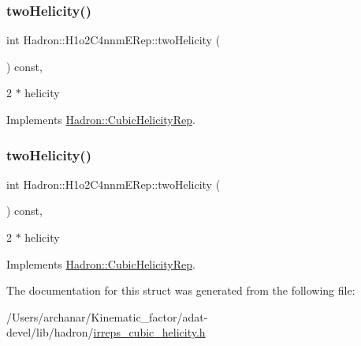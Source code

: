 \subsubsection{\texorpdfstring{twoHelicity()}{twoHelicity()}\hspace{0.1cm}{\footnotesize\ttfamily [2/3]}}
{\footnotesize\ttfamily int Hadron\+::\+H1o2\+C4nnm\+E\+Rep\+::two\+Helicity (\begin{DoxyParamCaption}{ }\end{DoxyParamCaption}) const\hspace{0.3cm}{\ttfamily [inline]}, {\ttfamily [virtual]}}

2 $\ast$ helicity 

Implements \mbox{\hyperlink{structHadron_1_1CubicHelicityRep_af507aa56fc2747eacc8cb6c96db31ecc}{Hadron\+::\+Cubic\+Helicity\+Rep}}.

\mbox{\label{structHadron_1_1H1o2C4nnmERep_ac93d65bb6c3d39b21cc3954eb7b92331}} 
\subsubsection{\texorpdfstring{twoHelicity()}{twoHelicity()}\hspace{0.1cm}{\footnotesize\ttfamily [3/3]}}
{\footnotesize\ttfamily int Hadron\+::\+H1o2\+C4nnm\+E\+Rep\+::two\+Helicity (\begin{DoxyParamCaption}{ }\end{DoxyParamCaption}) const\hspace{0.3cm}{\ttfamily [inline]}, {\ttfamily [virtual]}}

2 $\ast$ helicity 

Implements \mbox{\hyperlink{structHadron_1_1CubicHelicityRep_af507aa56fc2747eacc8cb6c96db31ecc}{Hadron\+::\+Cubic\+Helicity\+Rep}}.



The documentation for this struct was generated from the following file\+:\begin{DoxyCompactItemize}
\item 
/\+Users/archanar/\+Kinematic\+\_\+factor/adat-\/devel/lib/hadron/\mbox{\hyperlink{adat-devel_2lib_2hadron_2irreps__cubic__helicity_8h}{irreps\+\_\+cubic\+\_\+helicity.\+h}}\end{DoxyCompactItemize}
